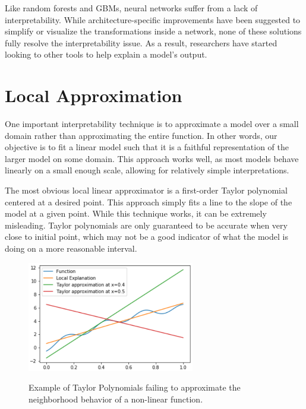 Like random forests and GBMs, neural networks suffer from a lack of interpretability. While architecture-specific improvements have been suggested to simplify \citep{Olden2002IlluminatingNetworks} or visualize \citep{Ozesmi1999AnInteraction} the transformations inside a network, none of these solutions fully resolve the interpretability issue. As a result, researchers have started looking to other tools to help explain a model's output.

\section{Local Approximation}

One important interpretability technique is to approximate a model over a small domain rather than approximating the entire function. In other words, our objective is to fit a linear model such that it is a faithful representation of the larger model on some domain. This approach works well, as most models behave linearly on a small enough scale, allowing for relatively simple interpretations. 

The most obvious local linear approximator is a first-order Taylor polynomial centered at a desired point. This approach simply fits a line to the slope of the model at a given point. While this technique works, it can be extremely misleading. Taylor polynomials are only guaranteed to be accurate when very close to initial point, which may not be a good indicator of what the model is doing on a more reasonable interval. 

\begin{figure}[t]
    \centering
    \caption{Example of Taylor Polynomials failing to approximate the neighborhood behavior of a non-linear function. \citep{Plumb2019RegularizingInterpretability}}
    \includegraphics[width=0.65\textwidth]{fig/taylor_polynomial}
    \label{fig:taylor_polynomial}
\end{figure}

